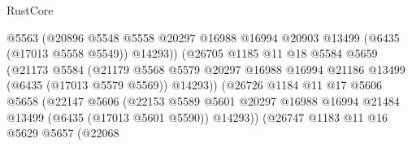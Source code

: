\begin{lexlean}{RustCore}
\begin{coremodule}
                                      @5563
                                      (@20896
                                        @5548
                                        @5558
                                        @20297
                                        @16988
                                        @16994
                                        @20903
                                        @13499
                                        (@6435 (@17013 @5558 @5549))
                                        @14293))
                                    (@26705
                                      @1185
                                      @11
                                      @18
                                      @5584
                                      @5659
                                      (@21173
                                        @5584
                                        (@21179
                                          @5568
                                          @5579
                                          @20297
                                          @16988
                                          @16994
                                          @21186
                                          @13499
                                          (@6435 (@17013 @5579 @5569))
                                          @14293))
                                      (@26726
                                        @1184
                                        @11
                                        @17
                                        @5606
                                        @5658
                                        (@22147
                                          @5606
                                          (@22153
                                            @5589
                                            @5601
                                            @20297
                                            @16988
                                            @16994
                                            @21484
                                            @13499
                                            (@6435 (@17013 @5601 @5590))
                                            @14293))
                                        (@26747
                                          @1183
                                          @11
                                          @16
                                          @5629
                                          @5657
                                          (@22068

\end{coremodule}
\end{lexlean}
